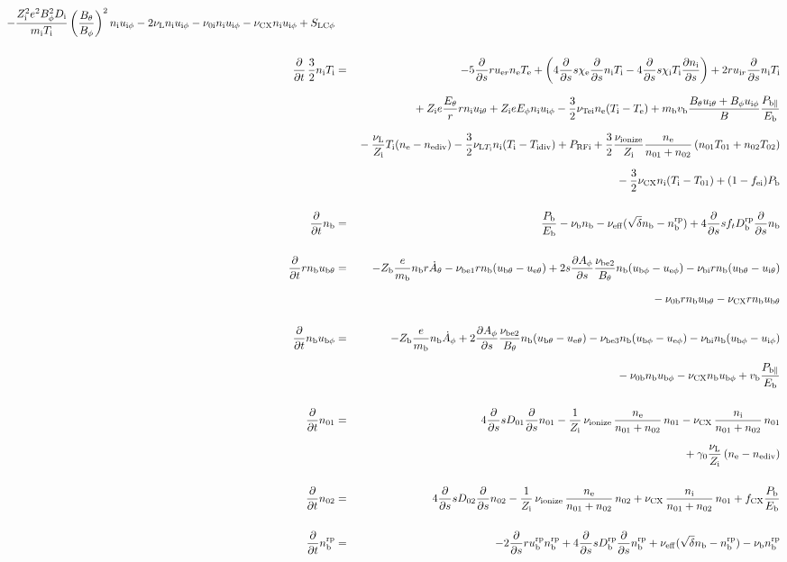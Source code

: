 \documentclass[11pt]{article}
\def\r#1{{\rm#1}}
\def\ddt{\frac{\partial}{\partial t}}
\def\dds{\frac{\partial}{\partial s}}
\def\dd#1{\frac{\partial #1}{\partial s}}
\def\mi{m_\r{i}}
\def\mb{m_\r{b}}
\def\Di{D_\r{i}}
\def\chie{\chi_\r{e}}
\def\chii{\chi_\r{i}}
\def\ne{n_\r{e}}
\def\ni{n_\r{i}}
\def\nb{n_\r{b}}
\def\uer{u_{\r{e}r}}
\def\uir{u_{\r{i}r}}
\def\ueth{u_{\r{e}\theta}}
\def\uith{u_{\r{i}\theta}}
\def\ubth{u_{\r{b}\theta}}
\def\ueph{u_{\r{e}\phi}}
\def\uiph{u_{\r{i}\phi}}
\def\ubph{u_{\r{b}\phi}}
\def\Eth{E_\theta}
\def\Eph{E_\phi}
\def\Bth{B_\theta}
\def\Bph{B_\phi}
\def\Athd{\dot{A}_\theta}
\def\Aphd{\dot{A}_\phi}
\def\Aph{A_\phi}
\def\Te{T_\r{e}}
\def\Ti{T_\r{i}}
\def\nna{n_{01}}
\def\nnb{n_{02}}
\def\Zi{Z_\r{i}}
\def\Zb{Z_\r{b}}
\def\Pb{P_\r{b}}
\def\Eb{E_\r{b}}
\def\PRFi{P_\r{RFi}}
\def\Tna{T_{01}}
\def\Tnb{T_{02}}
\def\fei{f_\r{ei}}
\def\nbrp{n_\r{b}^\r{rp}}
\def\Pbpara{P_{\r{b}\parallel}}
\def\nueff{\nu_\r{eff}}
\def\ubrp{u_\r{b}^\r{rp}}
\def\Dbrp{D_\r{b}^\r{rp}}
\def\fCX{f_\r{CX}}
\def\nuNCi{\nu_\r{NCi}}
\def\nubi{\nu_\r{bi}}
\def\nuni{\nu_\r{0i}}
\def\nunb{\nu_\r{0b}}
\def\nuL{\nu_\r{L}}
\def\nuCX{\nu_\r{CX}}
\def\nuion{\nu_\r{ionize}}
\def\nub{\nu_\r{b}}
\def\nuTei{\nu_\r{Tei}}
\def\vb{v_\r{b}}
\def\nediv{n_\r{ediv}}
\def\Tidiv{T_\r{idiv}}
\def\nuLTi{\nu_{\r{L}T_\r{i}}}
\begin{document}
\begin{eqnarray}
%
  - \frac{\Zi^2 e^2 \Bph^2 \Di}{\mi\Ti}\left(\frac{\Bth}{\Bph}\right)^2\ni\uiph
%
  - 2 \nuL \ni \uiph
%
  - \nuni \ni \uiph
%
  - \nuCX \ni \uiph
%
  + S_\r{LC\phi}
%
%
\\[5mm]
%
%
  \ddt \, \frac{3}{2} \ni \Ti &=&
%
  - 5 \dds r \uer \ne \Te
%
  + \left(   4 \dds s \chie \dds \ni \Ti 
%
           - 4 \dds s \chii \Ti \dd{\ni} \right)
%
  + 2 r \uir \dds \ni \Ti
%
\nonumber\\[2.5mm]&&{}
%
  + \Zi e \frac{\Eth}{r} r \ni \uith
%
  + \Zi e \Eph \ni \uiph
%
  - \frac{3}{2} \nuTei \ne (\Ti - \Te)
%
  + \mb \vb \frac{\Bth \uith + \Bph \uiph}{B} \frac{\Pbpara}{\Eb}  
\nonumber\\[2.5mm]&&{}
%
  - \frac{\nuL}{\Zi} \Ti (\ne - \nediv)
%
  - \frac{3}{2} \nuLTi \ni (\Ti - \Tidiv)
%
  + \PRFi
%
  + \frac{3}{2} \frac{\nuion}{\Zi} \frac{\ne}{\nna +\nnb}\, (\nna \Tna +
  \nnb \Tnb)
\nonumber\\[2.5mm]&&{}
%
  - \frac{3}{2} \nuCX \ni (\Ti - \Tna)
%
  + (1 - \fei) \Pb
\\[5mm]
%
%
  \ddt \nb &=&
%
    \frac{\Pb}{\Eb}
%
  - \nub \nb
%
  - \nueff (\sqrt{\delta}\nb - \nbrp)
%
  + 4 \dds s f_t \Dbrp \dds \nb
\\[5mm]
%
%
  \ddt r \nb \ubth &=&
%
  - \Zb \frac{e}{\mb} \nb r \Athd
%
%
  - \nu_\r{be1} r \nb (\ubth - \ueth)
%
  + 2 s \dd{\Aph} \frac{\nu_\r{be2}}{\Bth} \nb (\ubph - \ueph)
%
  - \nubi r \nb (\ubth - \uith)
\nonumber\\[2.5mm]&&{}
%
  - \nunb r \nb \ubth
%
  - \nuCX r \nb \ubth
\\[5mm]
%
%
  \ddt \nb \ubph &=&
%
  - \Zb \frac{e}{\mb} \nb \Aphd
%
  + 2 \dd{\Aph} \frac{\nu_\r{be2}}{\Bth} \nb (\ubth - \ueth)
%
  - \nu_\r{be3} \nb (\ubph - \ueph)
%
  - \nubi \nb (\ubph - \uiph)
\nonumber\\[2.5mm]&&{}
%
  - \nunb \nb \ubph
%
  - \nuCX \nb \ubph
%
  + \vb \frac{\Pbpara}{\Eb}
\\[5mm]
%
%
  \ddt \nna &=& 
%
    4 \dds s D_{01} \dds \nna
%
  - \frac{1}{\Zi}\, \nuion\, \frac{\ne}{\nna+\nnb}\, \nna
%
  - \nuCX\, \frac{\ni}{\nna+\nnb}\, \nna
\nonumber\\[2.5mm]&&{}
%
  + \gamma_0 \frac{\nuL}{\Zi} \, (\ne - \nediv)
\\[5mm]
%
%
  \ddt \nnb &=& 
%
    4 \dds s D_{02} \dds \nnb
%
  - \frac{1}{\Zi}\, \nuion\, \frac{\ne}{\nna+\nnb}\, \nnb
%
  + \nuCX\, \frac{\ni}{\nna+\nnb}\, \nna
%
  + \fCX \frac{\Pb}{\Eb}
\\[5mm]
%
%
  \ddt \nbrp &=&
%
  - 2 \dds r \ubrp \nbrp + 4 \dds s \Dbrp \dds \nbrp
%
  + \nueff (\sqrt{\delta} \nb - \nbrp)
%
  - \nub \nbrp
%
\end{eqnarray}
\end{document}
